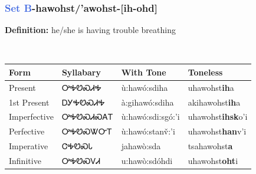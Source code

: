 \subsubsection*{\textcolor{RoyalBlue}{Set B}{-}\textbf{hawohst/'awohst}{-}[ih-ohd]}
\nopagebreak
\textbf{Definition: } he/she is having trouble breathing
\\[0.5em]
\begin{tabularx}{\textwidth}{l X X X}%
\toprule%
\textbf{Form}&\textbf{Syllabary}&\textbf{With Tone}&\textbf{Toneless}\\%
\midrule%
Present&ᎤᎭᏬᏍᏗᎭ&ù:hawó:sdiha&uhawohst\textbf{ih}a\\%
1st Present&ᎠᎩᎭᏬᏍᏗᎭ&à:gihawó:sdiha&akihawohst\textbf{ih}a\\%
Imperfective&ᎤᎭᏬᏍᏗᏍᎪᎢ&ù:hawó:sdi:sgó:’i&uhawohst\textbf{ihsk}o'i\\%
Perfective&ᎤᎭᏬᏍᏔᏅᎢ&ù:hawó:stanv̌:’i&uhawohst\textbf{han}v'i\\%
Imperative&ᏣᎭᏬᏍᏓ&jahawò:sda&tsahawohst\textbf{a}\\%
Infinitive&ᎤᎭᏬᏍᏙᏗ&u:hawò:sdóhdi&uhawohst\textbf{oht}i\\%
\bottomrule%
\end{tabularx}
\\[1em]